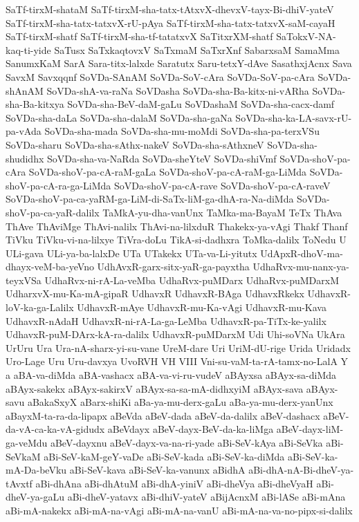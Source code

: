 {SaTf-tirxM-shataM
SaTf-tirxM-sha-tatx-tAtxvX-dhevxV-tayx-Bi-dhiV-yateV
SaTf-tirxM-sha-tatx-tatxvX-rU-pAya
SaTf-tirxM-sha-tatx-tatxvX-saM-cayaH
SaTf-tirxM-shatf
SaTf-tirxM-sha-tf-tatatxvX
SaTitxrXM-shatf
SaTokxV-NA-kaq-ti-yide
SaTusx
SaTxkaqtovxV
SaTxmaM
SaTxrXnf
SabarxsaM
SamaMma
SanumxKaM
SarA
Sara-titx-lalxde
Saratutx
Saru-tetxY-dAve
SasathxjAcnx
Sava
SavxM
Savxqqnf
SoVDa-SAnAM
SoVDa-SoV-cAra
SoVDa-SoV-pa-cAra
SoVDa-shAnAM
SoVDa-shA-va-raNa
SoVDasha
SoVDa-sha-Ba-kitx-ni-vARha
SoVDa-sha-Ba-kitxya
SoVDa-sha-BeV-daM-gaLu
SoVDashaM
SoVDa-sha-cacx-damf
SoVDa-sha-daLa
SoVDa-sha-dalaM
SoVDa-sha-gaNa
SoVDa-sha-ka-LA-savx-rU-pa-vAda
SoVDa-sha-mada
SoVDa-sha-mu-moMdi
SoVDa-sha-pa-terxVSu
SoVDa-sharu
SoVDa-sha-sAthx-nakeV
SoVDa-sha-sAthxneV
SoVDa-sha-shudidhx
SoVDa-sha-va-NaRda
SoVDa-sheYteV
SoVDa-shiVmf
SoVDa-shoV-pa-cAra
SoVDa-shoV-pa-cA-raM-gaLa
SoVDa-shoV-pa-cA-raM-ga-LiMda
SoVDa-shoV-pa-cA-ra-ga-LiMda
SoVDa-shoV-pa-cA-rave
SoVDa-shoV-pa-cA-raveV
SoVDa-shoV-pa-ca-yaRM-ga-LiM-di-SaTx-liM-ga-dhA-ra-Na-diMda
SoVDa-shoV-pa-ca-yaR-dalilx
TaMkA-yu-dha-vanUnx
TaMka-ma-BayaM
TeTx
ThAva
ThAve
ThAviMge
ThAvi-nalilx
ThAvi-na-lilxduR
Thakekx-ya-vAgi
Thakf
Thanf
TiVku
TiVku-vi-na-lilxye
TiVra-doLu
TikA-si-dadhxra
ToMka-dalilx
ToNedu
U
ULi-gava
ULi-ya-ba-lalxDe
UTa
UTakekx
UTa-va-Li-yitutx
UdApxR-dhoV-ma-dhayx-veM-ba-yeVno
UdhAvxR-garx-sitx-yaR-ga-payxtha
UdhaRvx-mu-nanx-ya-teyxVSa
UdhaRvx-ni-rA-La-veMba
UdhaRvx-puMDarx
UdhaRvx-puMDarxM
UdharxvX-mu-Ka-mA-gipaR
UdhavxR
UdhavxR-BAga
UdhavxRkekx
UdhavxR-loV-ka-ga-Lalilx
UdhavxR-mAye
UdhavxR-mu-Ka-vAgi
UdhavxR-mu-Kava
UdhavxR-nAdaH
UdhavxR-ni-rA-La-ga-LeMba
UdhavxR-pa-TiTx-ke-yalilx
UdhavxR-puM-DArx-kA-ra-dalilx
UdhavxR-puMDarxM
Udi
Uhi-soVNa
UkAra
UrUru
Ura
Ura-nA-sharx-yi-su-vane
UreM-dare
Uri
UriM-dU-rige
Urida
Uridadx
Uro-Lage
Uru
Uru-davxya
UvoRVH
VH
VIII
Vni-su-vaM-ta-rA-tamx-no-LalA
Y
a
aBA-va-diMda
aBA-vashacx
aBA-va-vi-ru-vudeV
aBAyxsa
aBAyx-sa-diMda
aBAyx-sakekx
aBAyx-sakirxV
aBAyx-sa-sa-mA-didhxyiM
aBAyx-sava
aBAyx-savu
aBakaSxyX
aBarx-shiKi
aBa-ya-mu-derx-gaLu
aBa-ya-mu-derx-yanUnx
aBayxM-ta-ra-da-lipapx
aBeVda
aBeV-dada
aBeV-da-dalilx
aBeV-dashacx
aBeV-da-vA-ca-ka-vA-gidudx
aBeVdayx
aBeV-dayx-BeV-da-ka-liMga
aBeV-dayx-liM-ga-veMdu
aBeV-dayxnu
aBeV-dayx-va-na-ri-yade
aBi-SeV-kAya
aBi-SeVka
aBi-SeVkaM
aBi-SeV-kaM-geY-vaDe
aBi-SeV-kada
aBi-SeV-ka-diMda
aBi-SeV-ka-mA-Da-beVku
aBi-SeV-kava
aBi-SeV-ka-vanunx
aBidhA
aBi-dhA-nA-Bi-dheV-ya-tAvxtf
aBi-dhAna
aBi-dhAtuM
aBi-dhA-yiniV
aBi-dheVya
aBi-dheVyaH
aBi-dheV-ya-gaLu
aBi-dheV-yatavx
aBi-dhiV-yateV
aBijAcnxM
aBi-lASe
aBi-mAna
aBi-mA-nakekx
aBi-mA-na-vAgi
aBi-mA-na-vanU
aBi-mA-na-va-no-pipx-si-dalilx
}
